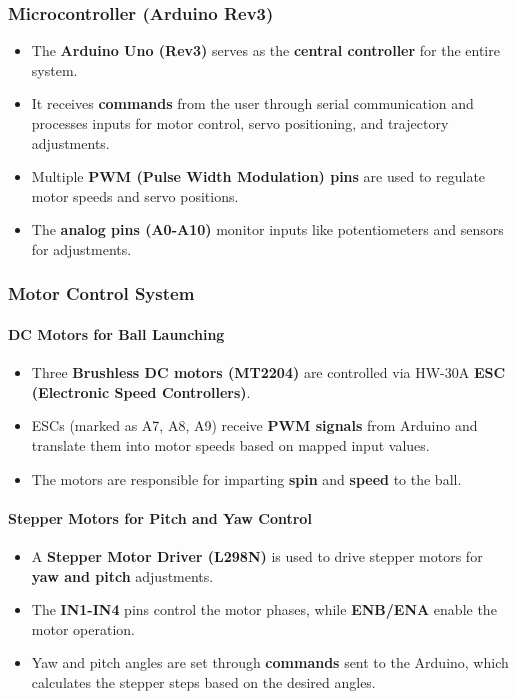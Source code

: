 \documentclass[12pt]{report}
\begin{document}
\subsubsection{Microcontroller (Arduino Rev3)}
\begin{itemize}
    \item The \textbf{Arduino Uno (Rev3)} serves as the \textbf{central controller} for the entire system.
    \item It receives \textbf{commands} from the user through serial communication and processes inputs for motor control, servo positioning, and trajectory adjustments.
    \item Multiple \textbf{PWM (Pulse Width Modulation) pins} are used to regulate motor speeds and servo positions.
    \item The \textbf{analog pins (A0-A10)} monitor inputs like potentiometers and sensors for adjustments.
\end{itemize}

\subsubsection{Motor Control System}
\paragraph{DC Motors for Ball Launching}
\begin{itemize}
    \item Three \textbf{Brushless DC motors (MT2204)} are controlled via HW-30A \textbf{ESC (Electronic Speed Controllers)}.
    \item ESCs (marked as A7, A8, A9) receive \textbf{PWM signals} from Arduino and translate them into motor speeds based on mapped input values.
    \item The motors are responsible for imparting \textbf{spin} and \textbf{speed} to the ball.
\end{itemize}

\paragraph{Stepper Motors for Pitch and Yaw Control}

\begin{itemize}
    \item A \textbf{Stepper Motor Driver (L298N)} is used to drive stepper motors for \textbf{yaw and pitch} adjustments.
    \item The \textbf{IN1-IN4} pins control the motor phases, while \textbf{ENB/ENA} enable the motor operation.
    \item Yaw and pitch angles are set through \textbf{commands} sent to the Arduino, which calculates the stepper steps based on the desired angles.
\end{itemize}
\end{document}
